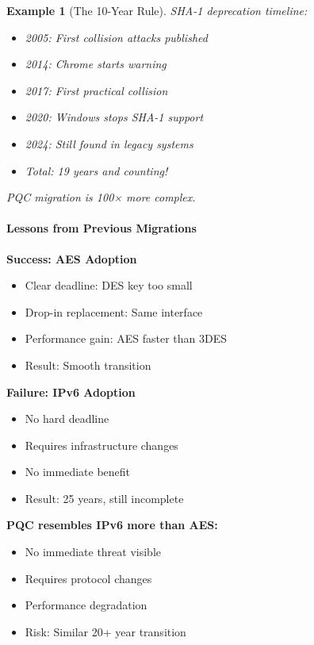\documentclass[11pt,a4paper]{article}
\newtheorem{example}{Example}
\begin{document}
\begin{example}[The 10-Year Rule]
SHA-1 deprecation timeline:
\begin{itemize}
    \item 2005: First collision attacks published
    \item 2014: Chrome starts warning
    \item 2017: First practical collision
    \item 2020: Windows stops SHA-1 support
    \item 2024: Still found in legacy systems
    \item Total: 19 years and counting!
\end{itemize}
PQC migration is 100× more complex.
\end{example}

\paragraph{Lessons from Previous Migrations}

\textbf{Success: AES Adoption}
\begin{itemize}
    \item Clear deadline: DES key too small
    \item Drop-in replacement: Same interface
    \item Performance gain: AES faster than 3DES
    \item Result: Smooth transition
\end{itemize}

\textbf{Failure: IPv6 Adoption}
\begin{itemize}
    \item No hard deadline
    \item Requires infrastructure changes
    \item No immediate benefit
    \item Result: 25 years, still incomplete
\end{itemize}

\textbf{PQC resembles IPv6 more than AES:}
\begin{itemize}
    \item No immediate threat visible
    \item Requires protocol changes
    \item Performance degradation
    \item Risk: Similar 20+ year transition
\end{itemize}
\end{document}
